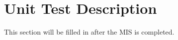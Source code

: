 \documentclass[12pt, titlepage]{article}
\begin{document}

\section{Unit Test Description}
This section will be filled in after the MIS is completed.

%
%
%
%
%
%
%
%
%
%
%
%
%
%
%
\end{document}
